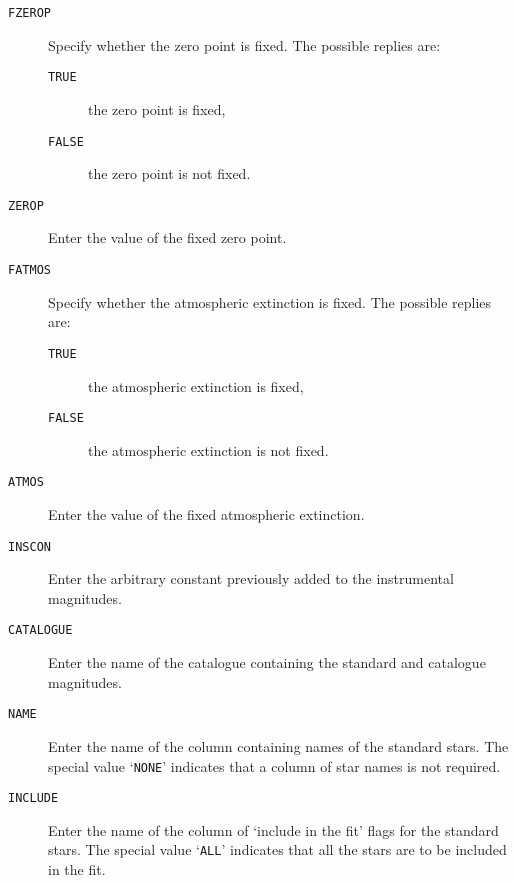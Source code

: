 \documentclass[twoside,11pt]{starlink}
\begin{document}
\begin{description}

  \item[ \texttt{FZEROP} ] Specify whether the zero point is fixed.  The
   possible replies are:

  \begin{description}

    \item[ \texttt{TRUE} ] the zero point is fixed,

    \item[ \texttt{FALSE} ] the zero point is not fixed.

  \end{description}

  \item[ \texttt{ZEROP} ] Enter the value of the fixed zero point.

  \item[ \texttt{FATMOS} ] Specify whether the atmospheric extinction is
   fixed.  The possible replies are:

  \begin{description}

    \item[ \texttt{TRUE} ] the atmospheric extinction is fixed,

    \item[ \texttt{FALSE} ] the atmospheric extinction is not fixed.

  \end{description}

  \item[ \texttt{ATMOS} ] Enter the value of the fixed atmospheric
   extinction.

  \item[ \texttt{INSCON} ] Enter the arbitrary constant previously added
   to the instrumental magnitudes.

  \item[ \texttt{CATALOGUE} ] Enter the name of the catalogue containing
   the standard and catalogue magnitudes.

  \item[ \texttt{NAME} ] Enter the name of the column containing names of
   the standard stars.  The special value `\texttt{NONE}' indicates that a
   column of star names is not required.

  \item[ \texttt{INCLUDE} ] Enter the name of the column of `include in the
   fit' flags for the standard stars.  The special value `\texttt{ALL}'
   indicates that all the stars are to be included in the fit.


\end{description}
\end{document}

